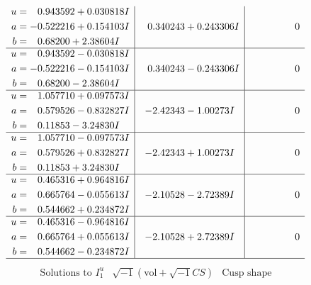 \documentclass[1p]{elsarticle_modified}
\theoremstyle{definition}
\newcommand{\I}{\sqrt{-1}}
\begin{document}
$$\begin{array}{c|c|c}
\begin{aligned}
u &= \phantom{-}0.943592 + 0.030818 I \\
a &= -0.522216 + 0.154103 I \\
b &= \phantom{-}0.68200 + 2.38604 I\end{aligned}
 & \phantom{-}0.340243 + 0.243306 I & \phantom{-0.000000 } 0 \\ \hline\begin{aligned}
u &= \phantom{-}0.943592 - 0.030818 I \\
a &= -0.522216 - 0.154103 I \\
b &= \phantom{-}0.68200 - 2.38604 I\end{aligned}
 & \phantom{-}0.340243 - 0.243306 I & \phantom{-0.000000 } 0 \\ \hline\begin{aligned}
u &= \phantom{-}1.057710 + 0.097573 I \\
a &= \phantom{-}0.579526 - 0.832827 I \\
b &= \phantom{-}0.11853 - 3.24830 I\end{aligned}
 & -2.42343 - 1.00273 I & \phantom{-0.000000 } 0 \\ \hline\begin{aligned}
u &= \phantom{-}1.057710 - 0.097573 I \\
a &= \phantom{-}0.579526 + 0.832827 I \\
b &= \phantom{-}0.11853 + 3.24830 I\end{aligned}
 & -2.42343 + 1.00273 I & \phantom{-0.000000 } 0 \\ \hline\begin{aligned}
u &= \phantom{-}0.465316 + 0.964816 I \\
a &= \phantom{-}0.665764 - 0.055613 I \\
b &= \phantom{-}0.544662 + 0.234872 I\end{aligned}
 & -2.10528 - 2.72389 I & \phantom{-0.000000 } 0 \\ \hline\begin{aligned}
u &= \phantom{-}0.465316 - 0.964816 I \\
a &= \phantom{-}0.665764 + 0.055613 I \\
b &= \phantom{-}0.544662 - 0.234872 I\end{aligned}
 & -2.10528 + 2.72389 I & \phantom{-0.000000 } 0\\
 \hline 
 \end{array}$$\newpage$$\begin{array}{c|c|c}  
\text{Solutions to }I^u_{1}& \I (\text{vol} + \sqrt{-1}CS) & \text{Cusp shape}\\

\end{array}$$
\end{document}
